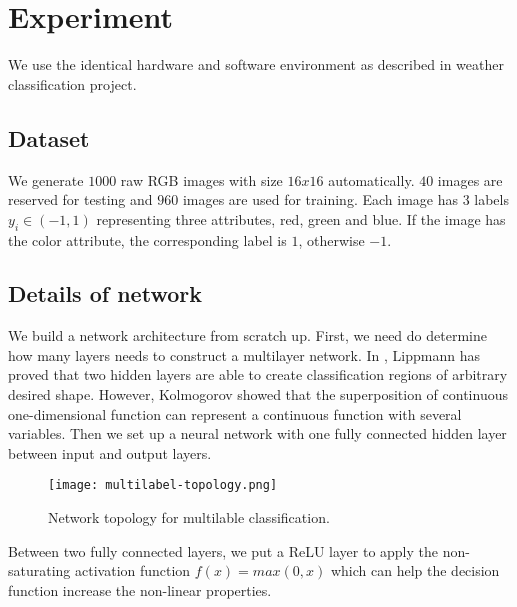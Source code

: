 
\chapter{Experiment} %
\label{Chapter8}

We use the identical hardware and software environment as described in weather classification project.

\section{Dataset}

We generate $1000$ raw RGB images with size $16x16$ automatically. $40$ images are reserved for testing and $960$ images are used for training. Each image has $3$ labels $y_i \in (-1, 1)$ representing three attributes, red, green and blue. If the image has the color attribute, the corresponding label is $1$, otherwise $-1$.

\section{Details of network}

We build a network architecture from scratch up. First, we need do determine how many layers needs to construct a multilayer network. In \cite{lippmann1987introduction}, Lippmann has proved that two hidden layers are able to create classification regions of arbitrary desired shape. However, Kolmogorov \citep{kolmogorov1963representation} showed that the superposition of continuous one-dimensional function can represent a continuous function with several variables. Then we set up a neural network with one fully connected hidden layer between input and output layers.
\begin{figure}[!htb]
\centering
\texttt{[image: multilabel-topology.png]}
\caption{\label{fig:MLtopology}Network topology for multilable classification.}
\end{figure}
Between two fully connected layers, we put a ReLU layer to apply the non-saturating activation function $f(x) = max(0,x)$ which can help the decision function increase the non-linear properties.

